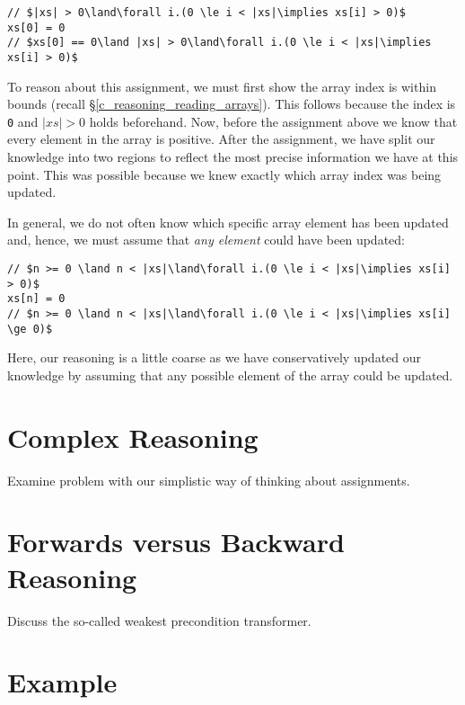 \begin{tcolorbox}\begin{lstlisting}[language=Whiley]
// $|xs| > 0\land\forall i.(0 \le i < |xs|\implies xs[i] > 0)$
xs[0] = 0
// $xs[0] == 0\land |xs| > 0\land\forall i.(0 \le i < |xs|\implies xs[i] > 0)$
\end{lstlisting}\end{tcolorbox}

To reason about this assignment, we must first show the array index is within bounds (recall \S\ref{c_reasoning_reading_arrays}).  This follows because the index is \lstinline{0} and $|xs| > 0$ holds beforehand.  Now, before the assignment above we know that every element in the array is positive.  After the assignment, we have split our knowledge into two regions to reflect the most precise information we have at this point.  This was possible because we knew exactly which array index was being updated.

In general, we do not often know which specific array element has been updated and, hence, we must assume that {\em any element} could have been updated:

\begin{tcolorbox}\begin{lstlisting}[language=Whiley]
// $n >= 0 \land n < |xs|\land\forall i.(0 \le i < |xs|\implies xs[i] > 0)$
xs[n] = 0
// $n >= 0 \land n < |xs|\land\forall i.(0 \le i < |xs|\implies xs[i] \ge 0)$
\end{lstlisting}\end{tcolorbox}

Here, our reasoning is a little coarse as we have conservatively updated our knowledge by assuming that any possible element of the array could be updated.

\section{Complex Reasoning}
Examine problem with our simplistic way of thinking about assignments.  

\section{Forwards versus Backward Reasoning}
Discuss the so-called weakest precondition transformer.

\section{Example}

